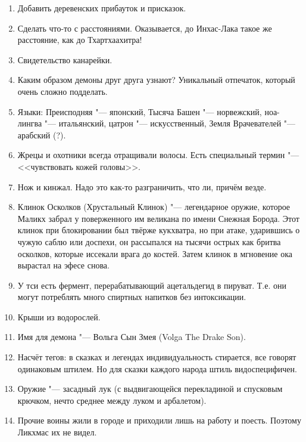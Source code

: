 \begin{enumerate}
\item Добавить деревенских прибауток и присказок.

\item Сделать что-то с расстояниями.
Оказывается, до Инхас-Лака такое же расстояние, как до Тхартхаахитра!

\item Свидетельство канарейки.

\item Каким образом демоны друг друга узнают?
Уникальный отпечаток, который очень сложно подделать.

\item Языки: Преисподняя "--- японский, Тысяча Башен "--- норвежский, ноа-лингва "--- итальянский, цатрон "--- искусственный, Земля Врачевателей "--- арабский (?).

\item Жрецы и охотники всегда отращивали волосы.
Есть специальный термин "--- <<чувствовать кожей головы>>.

\item Нож и кинжал.
Надо это как-то разграничить, что ли, причём везде.

\item Клинок Осколков (Хрустальный Клинок) "--- легендарное оружие, которое Маликх забрал у поверженного им великана по имени Снежная Борода.
Этот клинок при блокировании был твёрже кукхватра, но при атаке, ударившись о чужую саблю или доспехи, он рассыпался на тысячи острых как бритва осколков, которые иссекали врага до костей.
Затем клинок в мгновение ока вырастал на эфесе снова.

\item У тси есть фермент, перерабатывающий ацетальдегид в пируват.
Т.е. они могут потреблять много спиртных напитков без интоксикации.

\item Крыши из водорослей.

\item Имя для демона "--- Вольга Сын Змея (Volga The Drake Son).

\item Насчёт тегов: в сказках и легендах индивидуальность стирается, все говорят одинаковым штилем.
Но для сказки каждого народа штиль видоспецифичен.

\item Оружие "--- засадный лук (с выдвигающейся перекладиной и спусковым крючком, нечто среднее между луком и арбалетом).

\item Прочие воины жили в городе и приходили лишь на работу и поесть.
Поэтому Ликхмас их не видел.


\end{enumerate}
